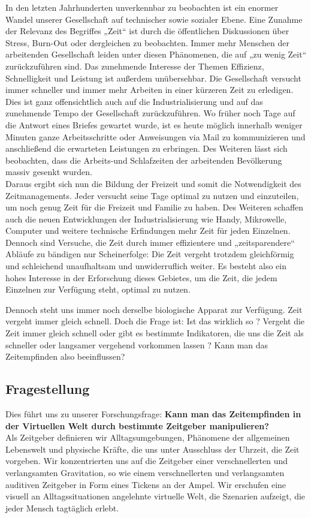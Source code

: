 \documentclass{Paper}
\begin{document}
In den letzten Jahrhunderten unverkennbar zu beobachten ist ein enormer Wandel unserer Gesellschaft auf technischer sowie sozialer Ebene.
Eine Zunahme der Relevanz des Begriffes „Zeit“ ist durch die öffentlichen Diskussionen über Stress, Burn-Out oder dergleichen zu beobachten.
Immer mehr Menschen der arbeitenden Gesellschaft leiden unter diesen Phänomenen, die auf „zu wenig Zeit“ zurückzuführen sind. Das zunehmende Interesse der Themen Effizienz, Schnelligkeit und Leistung ist außerdem unübersehbar. Die Gesellschaft versucht immer schneller und immer mehr Arbeiten in einer kürzeren Zeit zu erledigen. Dies ist ganz offensichtlich auch auf die Industrialisierung und auf das zunehmende Tempo der Gesellschaft zurückzuführen. Wo früher noch Tage auf die Antwort eines Briefes gewartet wurde, ist es heute möglich innerhalb weniger Minuten ganze Arbeitsschritte oder Anweisungen via Mail zu kommunizieren und anschließend die erwarteten Leistungen zu erbringen.
Des Weiteren lässt sich beobachten, dass die Arbeits-und Schlafzeiten der arbeitenden Bevölkerung massiv gesenkt wurden.
\\
Daraus ergibt sich nun die Bildung der Freizeit und somit die Notwendigkeit des Zeitmanagements. Jeder versucht seine Tage optimal zu nutzen und einzuteilen, um noch genug Zeit für die Freizeit und Familie zu haben. Des Weiteren schaffen auch die neuen Entwicklungen der Industrialisierung wie Handy, Mikrowelle, Computer und weitere technische Erfindungen mehr Zeit für jeden Einzelnen. Dennoch sind Versuche, die Zeit durch immer effizientere und „zeitsparendere“ Abläufe zu bändigen nur Scheinerfolge: Die Zeit vergeht trotzdem gleichförmig und schleichend unaufhaltsam und unwiderruflich weiter. Es besteht also ein hohes Interesse in der Erforschung dieses Gebietes, um die Zeit, die jedem Einzelnen zur Verfügung steht, optimal zu nutzen.

Dennoch steht uns immer noch derselbe biologische Apparat zur Verfügung. Zeit vergeht immer gleich schnell. Doch die Frage ist: Ist das wirklich so ? Vergeht die Zeit immer gleich schnell oder gibt es bestimmte Indikatoren, die uns die Zeit als schneller oder langsamer vergehend vorkommen lassen ? Kann man das Zeitempfinden also beeinflussen?

\subsection{Fragestellung }
Dies führt uns zu unserer Forschungsfrage: \textbf{Kann man das Zeitempfinden in der Virtuellen Welt durch bestimmte Zeitgeber manipulieren?}\\
Als Zeitgeber definieren wir Alltagsumgebungen, Phänomene der allgemeinen Lebenswelt und physische Kräfte, die uns unter Ausschluss der Uhrzeit, die Zeit vorgeben.
Wir konzentrierten uns auf die Zeitgeber einer verschnellerten und verlangsamten Gravitation, so wie einem verschnellerten und verlangsamten auditiven Zeitgeber in Form eines Tickens an der Ampel. Wir erschufen eine visuell an Alltagssituationen angelehnte virtuelle Welt, die Szenarien aufzeigt, die jeder Mensch tagtäglich erlebt.
\end{document}
